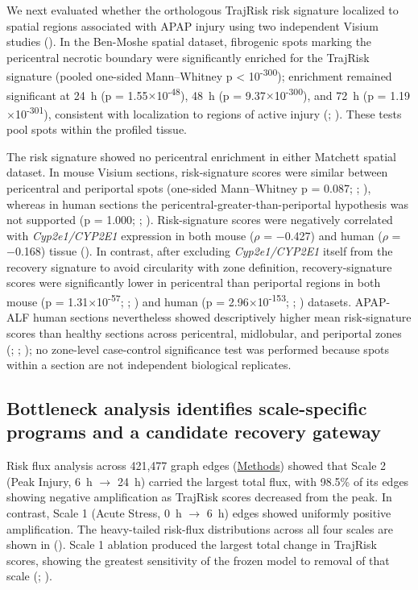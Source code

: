 We next evaluated whether the orthologous TrajRisk risk signature localized to spatial regions associated with APAP injury using two independent Visium studies (). In the Ben-Moshe spatial dataset, fibrogenic spots marking the pericentral necrotic boundary were significantly enriched for the TrajRisk signature (pooled one-sided Mann--Whitney p < 10\textsuperscript{-300}); enrichment remained significant at 24~h (p = 1.55\ensuremath{\times}10\textsuperscript{-48}), 48~h (p = 9.37\ensuremath{\times}10\textsuperscript{-300}), and 72~h (p = 1.19\ensuremath{\times}10\textsuperscript{-301}), consistent with localization to regions of active injury (; ). These tests pool spots within the profiled tissue.

The risk signature showed no pericentral enrichment in either Matchett spatial dataset. In mouse Visium sections, risk-signature scores were similar between pericentral and periportal spots (one-sided Mann--Whitney p = 0.087; ; ), whereas in human sections the pericentral-greater-than-periportal hypothesis was not supported (p = 1.000; ; ). Risk-signature scores were negatively correlated with \textit{Cyp2e1/CYP2E1} expression in both mouse (\ensuremath{\rho} = \ensuremath{-}0.427) and human (\ensuremath{\rho} = \ensuremath{-}0.168) tissue (). In contrast, after excluding \textit{Cyp2e1/CYP2E1} itself from the recovery signature to avoid circularity with zone definition, recovery-signature scores were significantly lower in pericentral than periportal regions in both mouse (p = 1.31\ensuremath{\times}10\textsuperscript{-57}; ; ) and human (p = 2.96\ensuremath{\times}10\textsuperscript{-153}; ; ) datasets. APAP-ALF human sections nevertheless showed descriptively higher mean risk-signature scores than healthy sections across pericentral, midlobular, and periportal zones (; ; ); no zone-level case-control significance test was performed because spots within a section are not independent biological replicates.

\subsection*{Bottleneck analysis identifies scale-specific programs and a candidate recovery gateway}

Risk flux analysis across 421,477 graph edges (\hyperref[sec:methods]{Methods}) showed that Scale 2 (Peak Injury, 6~h \ensuremath{\rightarrow} 24~h) carried the largest total flux, with 98.5\% of its edges showing negative amplification as TrajRisk scores decreased from the peak. In contrast, Scale 1 (Acute Stress, 0~h \ensuremath{\rightarrow} 6~h) edges showed uniformly positive amplification. The heavy-tailed risk-flux distributions across all four scales are shown in  (). Scale 1 ablation produced the largest total change in TrajRisk scores, showing the greatest sensitivity of the frozen model to removal of that scale (; ).

